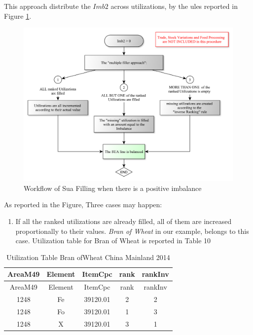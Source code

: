 \documentclass[]{article}
\providecommand{\tightlist}{%
  \setlength{\itemsep}{0pt}\setlength{\parskip}{0pt}}
\begin{document}
This approach distribute the \(Imb2\) across utilizations, by the ules
reported in Figure \ref{fig:f7}.

\begin{figure}

{\centering \includegraphics{images/07_PositiveImbalance} 

}

\caption{\label{fig:f5}Workflow of Sua Filling when there is a positive imbalance}\label{fig:f7}
\end{figure}

As reported in the Figure, Three cases may happen:

\begin{enumerate}
\def\labelenumi{\arabic{enumi}.}
\tightlist
\item
  If all the ranked utilizations are already filled, all of them are
  increased proportionally to their values. \emph{Bran of Wheat} in our
  example, belongs to this case. Utilization table for Bran of Wheat is
  reported in Table 10
\end{enumerate}

\begin{longtable}[]{@{}ccccc@{}}
\caption{Utilization Table Bran ofWheat China Mainland
2014}\tabularnewline
\toprule
AreaM49 & Element & ItemCpc & rank & rankInv\tabularnewline
\midrule
\endfirsthead
\toprule
AreaM49 & Element & ItemCpc & rank & rankInv\tabularnewline
\midrule
\endhead
1248 & Fe & 39120.01 & 2 & 2\tabularnewline
1248 & Fo & 39120.01 & 1 & 3\tabularnewline
1248 & X & 39120.01 & 3 & 1\tabularnewline
\bottomrule
\end{longtable}
\end{document}
